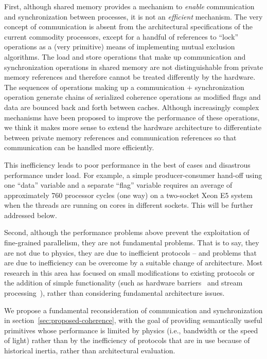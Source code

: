 
First, although shared memory provides a mechanism to \textit{enable} communication 
and synchronization between processes, it is not an \textit{efficient} mechanism.  The 
very concept of communication is absent from the architectural specifications of the
current commodity processors, except for a handful of references to ``lock'' operations
as a (very primitive) means of implementing mutual exclusion algorithms. 
The load and store operations that make up communication and synchronization 
operations in shared memory are not distinguishable from private memory references
and therefore cannot be treated differently by the hardware.   The sequences of 
operations making up a communication + synchronization operation generate chains
of serialized coherence operations as modified flags and data are bounced back and
forth between caches.  Although increasingly complex mechanisms have been proposed
to improve the performance of these operations, we think it makes more sense to 
extend the hardware architecture to differentiate between private memory references and 
communication references so that communication can be handled more efficiently.

This inefficiency leads to poor performance in the best of cases and disastrous 
performance under load.   For example, a simple producer-consumer hand-off using one
``data'' variable and a separate ``flag'' variable requires an average of approximately 760 
processor cycles (one way) on a two-socket Xeon E5 system when the threads are running 
on cores in different sockets. This will be further addressed below.

Second, although the performance problems above prevent the exploitation of 
fine-grained parallelism, they are not fundamental problems.  That is to say, they
are not due to physics, they are due to inefficient protocols -- and problems that are 
due to inefficiency can be overcome by a suitable change of architecture.  Most 
research in this area has focused on small modifications to existing protocols or 
the addition of simple functionality (such as hardware barriers~\cite{Voltron2007,
OnChipMulticoreBarriers_2006} and stream processing~\cite{srinii2003reconfigurable}),
rather than considering fundamental architecture issues.  

We propose a fundamental reconsideration of communication and synchronization in 
section~\ref{sec:proposed-coherence}, with the goal of providing semantically useful 
primitives whose performance is limited by physics (i.e., bandwidth or the speed of light) 
rather than by the inefficiency of protocols that are in use because of historical inertia, 
rather than architectural evaluation.

